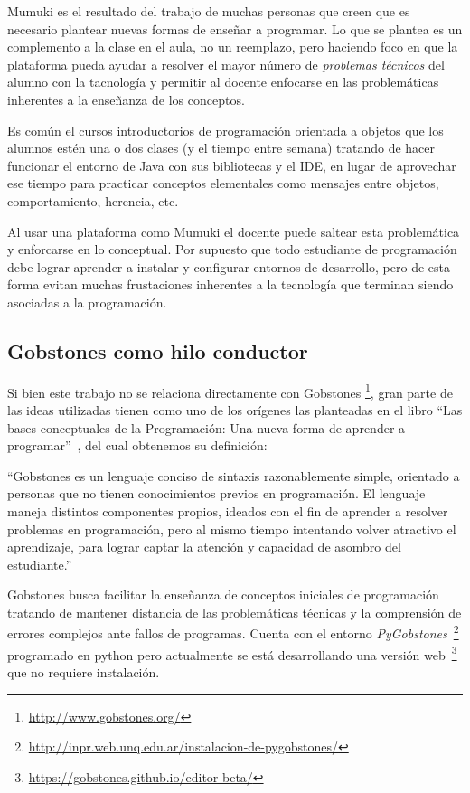 Mumuki es el resultado del trabajo de muchas personas que creen
que es necesario plantear nuevas formas de enseñar a programar.
Lo que se plantea es un complemento a la clase en el aula, no
un reemplazo, pero haciendo foco en que la plataforma pueda ayudar
a resolver el mayor número de \textit{problemas técnicos}
del alumno con la tacnología y permitir al docente enfocarse
en las problemáticas inherentes a la enseñanza de los conceptos.

Es común el cursos introductorios de programación orientada a objetos que los alumnos
estén una o dos clases (y el tiempo entre semana) tratando de hacer funcionar
el entorno de Java con sus bibliotecas y el IDE, en lugar de
aprovechar ese tiempo para practicar conceptos elementales como mensajes
entre objetos, comportamiento, herencia, etc.

Al usar una plataforma como Mumuki el docente puede saltear esta problemática
y enforcarse en lo conceptual. Por supuesto que todo estudiante de programación
debe lograr aprender a instalar y configurar entornos de desarrollo, pero
de esta forma evitan muchas frustaciones inherentes a la tecnología
que terminan siendo asociadas a la programación.

\subsection{Gobstones como hilo conductor}

Si bien este trabajo no se relaciona directamente con Gobstones
\footnote{\url{http://www.gobstones.org/}},
gran parte de las ideas utilizadas tienen como uno
de los orígenes las planteadas en el libro
\enquote{Las bases conceptuales de la Programación: Una nueva forma de aprender a programar}~\cite{LibroGobstones}, del cual obtenemos su definición:

\begin{displayquote}
``Gobstones es un lenguaje conciso de sintaxis razonablemente simple,
orientado a personas que no tienen conocimientos previos en programación.
El lenguaje maneja distintos componentes propios, ideados con el fin de
aprender a resolver problemas en programación,  pero al mismo tiempo
intentando volver atractivo el aprendizaje, para lograr captar la atención
y capacidad de asombro del estudiante.''
\end{displayquote}

Gobstones busca facilitar la enseñanza de conceptos iniciales de programación
tratando de mantener distancia de las problemáticas técnicas y
la comprensión de errores complejos ante fallos de programas.
Cuenta con el entorno \textit{PyGobstones}~\footnote{\url{http://inpr.web.unq.edu.ar/instalacion-de-pygobstones/}} programado en python
pero actualmente se está desarrollando una versión web~\footnote{\url{https://gobstones.github.io/editor-beta/}} que no requiere instalación.


